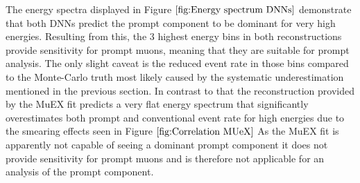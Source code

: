 \documentclass[
  tucolor,       %
  BCOR=12mm,     %
  parskip=half,  %
  open=any,      %
  cleardoublepage=plain,  %
]{tudothesis}
\begin{document}
The energy spectra displayed in Figure $\ref{fig:Energy spectrum DNNs}$ demonstrate that both DNNs predict the prompt component to be dominant for very high energies.
Resulting from this, the 3 highest energy bins in both reconstructions provide sensitivity for prompt muons, meaning that they are suitable for prompt analysis.
The only slight caveat is the reduced event rate in those bins compared to the Monte-Carlo truth 
most likely caused by the systematic underestimation mentioned in the previous section.
In contrast to that the reconstruction provided by the MuEX fit predicts a very flat energy spectrum that significantly overestimates both prompt and conventional event rate for high energies due to the smearing effects seen in Figure $\ref{fig:Correlation MUeX}$
As the MuEX fit is apparently not capable of seeing a dominant prompt component it does not provide sensitivity for prompt muons and is therefore not applicable for an analysis of the prompt component.
\end{document}
